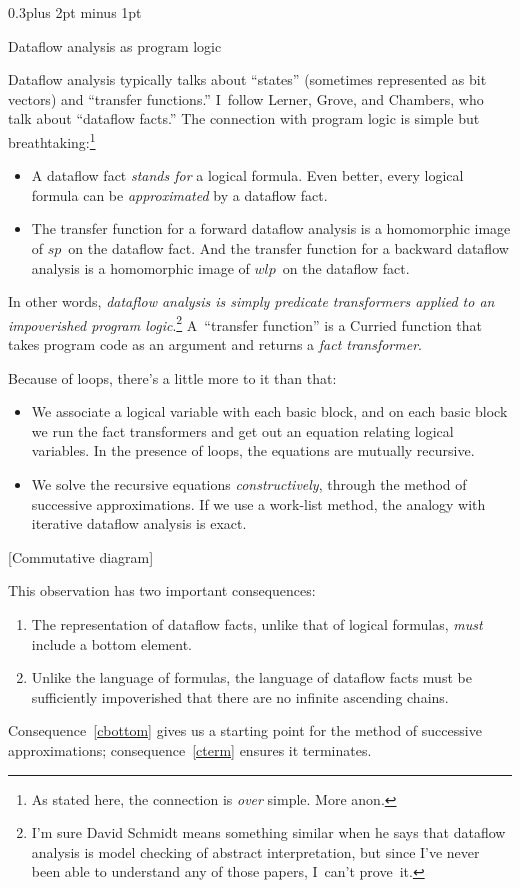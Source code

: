 \documentclass[twocolumn]{article}
\makeatletter
\newcommand\mysection[1]{%
  \par
  \vskip 0.5\baselineskip plus 2pt minus 1pt
  \noindent{\raggedright\textbf{#1}}
  \par
  \vskip 0.3\baselineskip plus 2pt minus 1pt
  \@afterindentfalse
}
\renewcommand\wp{\ensuremath{\mathit{wlp}}}
\let\wlp=\wp
\renewcommand\sp{\ensuremath{\mathit{sp}}}
\renewcommand\mysection[1]{%
  \@startsection{section}{1}{\z@}{-0.5\baselineskip plus -2pt minus -1pt}%
                                   {0.3\baselineskip plus 2pt minus 1pt}%
           {\normalfont\raggedright\bfseries}}
\makeatother
\begin{document}
\mysection*{Dataflow analysis as program logic}

Dataflow analysis typically talks about ``states'' (sometimes
represented as bit vectors) and ``transfer functions.''
I~follow Lerner, Grove, and Chambers, who talk about ``dataflow facts.''
The connection with program logic is simple but breathtaking:\footnote
{As stated here, the connection is \emph{over} simple.  More anon.}
\begin{itemize}
\item
A dataflow fact \emph{stands for} a logical formula.
Even better, every logical formula can be \emph{approximated} by a
dataflow fact.
\item
The transfer function for a forward dataflow analysis is a homomorphic
image of \sp\ on the dataflow fact.
And the transfer function for a backward dataflow analysis is a homomorphic
image of \wlp\ on the dataflow fact.
\end{itemize}
In other words, \emph{dataflow analysis is simply predicate
  transformers applied to an impoverished program logic}.\footnote
{I'm sure David Schmidt means something similar when he says that
  dataflow analysis is model checking of abstract interpretation, but
  since I've never been able to understand any of those papers,
  I~can't prove~it.}
A~``transfer function'' is a Curried function that takes program code
  as an argument and returns a \emph{fact transformer}.

Because of loops, there's a little more to it than that:
\begin{itemize}
\item
We associate a logical variable with each basic block,
and on each basic block 
 we run the fact transformers and get out an equation relating logical
 variables.
In the presence of loops, the equations are mutually recursive.
\item
We solve the recursive equations \emph{constructively}, through the
method of successive approximations.
If we use a work-list method,
the analogy with iterative dataflow analysis is exact.
\end{itemize}

[Commutative diagram]

This observation has two important consequences:
\begin{enumerate} 
\item
\label{cbottom}
The representation of dataflow facts, unlike that of
logical formulas, \emph{must} include a bottom element.
\item
\label{cterm}
Unlike the language of formulas, 
the language of dataflow facts must be sufficiently impoverished that
there are no infinite ascending chains.
\end{enumerate}
Consequence~\ref{cbottom} gives us a starting point for the method of
successive approximations; consequence~\ref{cterm} ensures it terminates.
\end{document}
